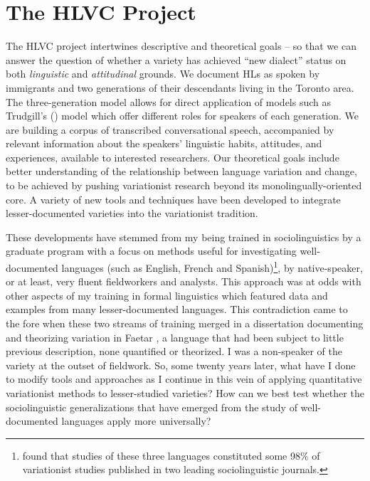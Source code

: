 \documentclass[output=paper]{LSP/langsci}
\begin{document}
\section{The HLVC Project}

The HLVC project intertwines descriptive and theoretical goals – so that we can answer the question of whether a variety has achieved “new dialect” status on both \textit{linguistic} and \textit{attitudinal} grounds. We document HLs as spoken by immigrants and two generations of their descendants living in the Toronto area. The three-generation model allows for direct application of models such as Trudgill’s (\citeyear{trudgill_dialects_1986}) model which offer different roles for speakers of each generation. We are building a corpus of transcribed conversational speech, accompanied by relevant information about the speakers’ linguistic habits, attitudes, and experiences, available to interested researchers. Our theoretical goals include better understanding of the relationship between language variation and change, to be achieved by pushing variationist research beyond its monolingually-oriented core. A variety of new tools and techniques have been developed to integrate lesser-documented varieties into the variationist tradition. 

These developments have stemmed from my being trained in sociolinguistics by a graduate program with a focus on methods useful for investigating well-documented languages (such as English, French and Spanish)\footnote{ \citet{nagy_love_2008} found that studies of these three languages constituted some 98\% of variationist studies published in two leading sociolinguistic journals.}, by native-speaker, or at least, very fluent fieldworkers and analysts. This approach was at odds with other aspects of my training in formal linguistics which featured data and examples from many lesser-documented languages. This contradiction came to the fore when these two streams of training merged in a dissertation documenting and theorizing variation in Faetar \citep{nagy_language_1996}, a language that had been subject to little previous description, none quantified or theorized. I was a non-speaker of the variety at the outset of fieldwork. So, some twenty years later, what have I done to modify tools and approaches as I continue in this vein of applying quantitative variationist methods to lesser-studied varieties? How can we best test whether the sociolinguistic generalizations that have emerged from the study of well-documented languages apply more universally?
\end{document}

